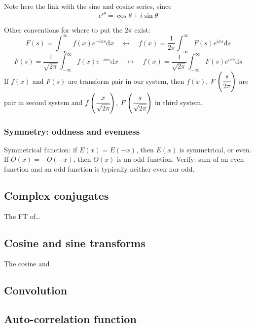 \documentclass[12pt]{article}
\newcommand{\mar}[1]{\hspace{0pt}\marginpar{-\textcolor{black}{#1}-}}
\begin{document}
Note here the link with the sine and cosine series, since
\[
    e^{i\theta} = \cos\theta + i\sin\theta
    \]

\mar{F2}Other conventions for where to put the $2\pi$ exist:
\[
    F(s) = \int_{-\infty}^{\infty}{
        f(x)e^{-ixs} \mathrm{d}x}
    \quad\longleftrightarrow\quad
    f(x) = \frac{1}{2\pi} \int_{-\infty}^{\infty}{
        F(s)e^{ixs} \mathrm{d}s}
    \]
\[
    F(s) = \frac{1}{\sqrt{2\pi}} \int_{-\infty}^{\infty}{
        f(x)e^{-ixs} \mathrm{d}x}
    \quad\longleftrightarrow\quad
    f(x) = \frac{1}{\sqrt{2\pi}} \int_{-\infty}^{\infty}{
        F(s)e^{ixs} \mathrm{d}s}
    \]
If $f(x)$ and $F(s)$ are transform pair in our system, then $f(x)$,
$F \left( \cfrac{s}{2\pi} \right)$ are pair in second system and
$f \left( \cfrac{x}{\sqrt{2\pi}} \right)$,
$F \left( \cfrac{s}{\sqrt{2\pi}} \right)$ in third system.

\subsubsection{Symmetry: oddness and evenness}
Symmetrical function: if $E(x) = E(-x)$, then $E(x)$ is symmetrical,
or even. If $O(x) = -O(-x)$, then $O(x)$ is an odd function.
\mar{F3}Verify: sum of an even function and an odd function is typically
neither even nor odd.


\subsection{Complex conjugates}
\mar{F6}The FT of\ldots

\subsection{Cosine and sine transforms}

\mar{F7}The cosine and

\subsection{Convolution}

\mar{F10}

\subsection{Auto-correlation function}
\end{document}
